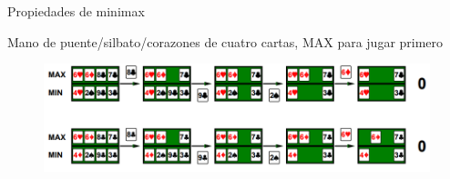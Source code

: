 \begin{frame}{Propiedades de minimax}
    
    Mano de puente/silbato/corazones de cuatro cartas, {\selectfont MAX} para jugar primero
    
    \begin{figure}[t]
    \centering
    \includegraphics[width=12cm]{32_image_cards2.PNG}
    \end{figure}
   
\end{frame}